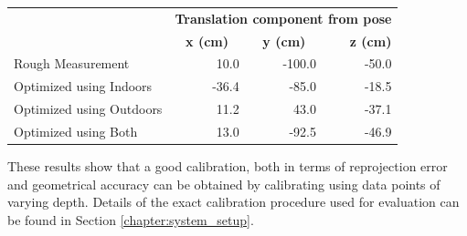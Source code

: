 \begin{table}[H]
    \begin{tabular}{ p{6cm} r r r} %
    \toprule
    & \multicolumn{3}{r}{\bf{Translation component from pose}}  \\
    & \multicolumn{1}{c}{\hspace*{1cm}\bf{x (cm)}} & \multicolumn{1}{c}{\hspace*{1cm}\bf{y (cm)}} & \hspace*{1cm}\bf{z (cm)} \\
    \midrule
    Rough Measurement & 10.0 & -100.0 & -50.0 \\
    Optimized using Indoors & -36.4 & -85.0 & -18.5\\
    Optimized using Outdoors & 11.2 & 43.0 & -37.1 \\
    Optimized using Both & 13.0 & -92.5 & -46.9 \\ 
    \bottomrule
    \end{tabular}
  \label{tab:geometry}
\end{table}

These results show that a good calibration, both in terms of reprojection error and geometrical accuracy can be obtained by calibrating using data points of varying depth.
Details of the exact calibration procedure used for evaluation can be found in Section \ref{chapter:system_setup}.

